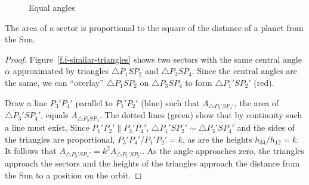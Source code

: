 \begin{figure}
\begin{minipage}{.48\textwidth}
\begin{center}
\caption{Equal angles}\label{f.f-equal-angles}
\end{center}
\end{minipage}
\end{figure}


\begin{theorem}\label{thm.f-proportional}
The area of a sector is proportional to the square of the distance of a planet from the Sun.
\end{theorem}

\begin{proof}
Figure~\ref{f.f-similar-triangles} shows two sectors with the same central angle $\alpha$ approximated by triangles $\triangle P_1SP_2$ and $\triangle P_3SP_4$. Since the central angles are the same, we can ``overlay'' $\triangle P_1SP_2$ on $\triangle P_3SP_4$ to form $\triangle P_1'SP_2'$ (red).

Draw a line $P_3'P_4'$ parallel to $P_1'P_2'$ (blue) such that $A_{\triangle P_3'SP_4'}$, the area of $\triangle P_3'SP_4'$, equals $A_{\triangle P_3 SP_4}$. The dotted lines (green) show that by continuity such a line must exist. Since $P_1'P_2'\parallel P_3'P_4'$, $\triangle P_1'SP_2'\sim \triangle P_3'SP_4'$ and the sides of the triangles are proportional, $P_3'P_4'/P_1'P_2' = k$, as are the heights $h_{34}/h_{12}=k$. It follows that $A_{\triangle P_3'SP_4'}=k^2 A_{\triangle P_1'SP_2'}$. As the angle approaches zero, the triangles approach the sectors and the heights of the triangles approach the distance from the Sun to a position on the orbit.
\hqed 
\end{proof}

